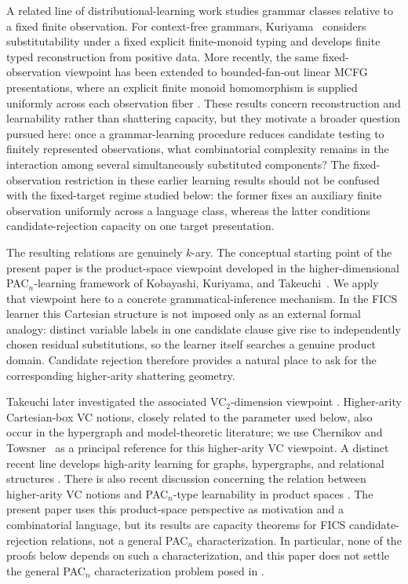 \documentclass[11pt]{article}
\theoremstyle{definition}
\theoremstyle{remark}
\begin{document}
A related line of distributional-learning work studies grammar classes relative
to a fixed finite observation.  For context-free grammars,
Kuriyama~\cite{KuriyamaFixedMonoidCFG} considers substitutability under a fixed
explicit finite-monoid typing and develops finite typed reconstruction from
positive data.  More recently, the same fixed-observation viewpoint has been
extended to bounded-fan-out linear MCFG presentations, where an explicit finite
monoid homomorphism is supplied uniformly across each observation fiber
\cite{KuriyamaFixedObservationMCFG}.  These results concern reconstruction and
learnability rather than shattering capacity, but they motivate a broader
question pursued here: once a grammar-learning procedure reduces candidate
testing to finitely represented observations, what combinatorial complexity
remains in the interaction among several simultaneously substituted
components?  The fixed-observation restriction in these earlier learning
results should not be confused with the fixed-target regime studied below: the
former fixes an auxiliary finite observation uniformly across a language class,
whereas the latter conditions candidate-rejection capacity on one target
presentation.

The resulting relations are genuinely \(k\)-ary.  The conceptual starting
point of the present paper is the product-space viewpoint developed in the
higher-dimensional PAC\(_n\)-learning framework of Kobayashi, Kuriyama, and
Takeuchi~\cite{KobayashiKuriyamaTakeuchi2015}.  We apply that viewpoint here to
a concrete grammatical-inference mechanism.  In the FICS learner this
Cartesian structure is not imposed only as an external formal analogy:
distinct variable labels in one candidate clause give rise to independently
chosen residual substitutions, so the learner itself searches a genuine
product domain.  Candidate rejection therefore provides a natural place to
ask for the corresponding higher-arity shattering geometry.

Takeuchi later investigated the associated VC\(_2\)-dimension viewpoint
\cite{Takeuchi2020}.  Higher-arity Cartesian-box VC notions, closely related to
the parameter used below, also occur in the hypergraph and model-theoretic
literature; we use Chernikov and Towsner~\cite{ChernikovTowsner2020} as a
principal reference for this higher-arity VC viewpoint.  A distinct recent
line develops high-arity learning for graphs, hypergraphs, and relational
structures
\cite{CoreglianoMalliaris2024,CoreglianoMalliaris2025,CoreglianoOpich2026}.
There is also recent discussion concerning the relation between higher-arity
VC notions and PAC\(_n\)-type learnability in product spaces
\cite{ChernikovTowsner2025,Malliaris2025Remarks}.  The present paper uses this
product-space perspective as motivation and a combinatorial language, but its
results are capacity theorems for FICS candidate-rejection relations, not a
general PAC\(_n\) characterization.  In particular, none of the proofs below
depends on such a characterization, and this paper does not settle the general
PAC\(_n\) characterization problem posed in \cite{Takeuchi2020}.
\end{document}

